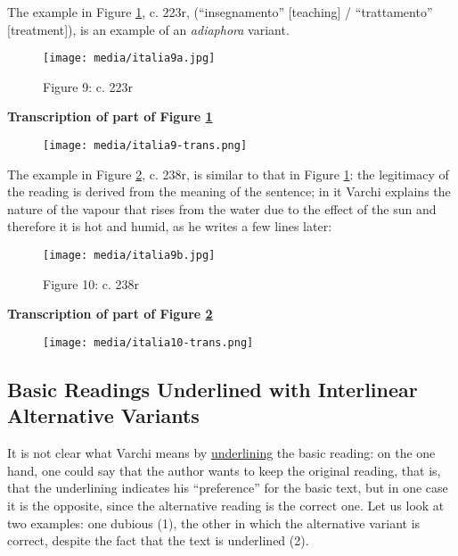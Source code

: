 \documentclass{article}
\begin{document}
The example in Figure \ref{fig:italia9a}, c. 223r, (``insegnamento'' [teaching] / ``trattamento'' [treatment]), is an example of an \emph{adiaphora} variant.

\begin{figure}[H]
    \centering
    \texttt{[image: media/italia9a.jpg]}
    \caption{Figure 9: c. 223r}
    \label{fig:italia9a}
\end{figure}

\textbf{Transcription of part of Figure \ref{fig:italia9a}}

\begin{figure}
    \centering
    \texttt{[image: media/italia9-trans.png]}
\end{figure}

The example in Figure \ref{fig:italia9b}, c. 238r, is similar to that in Figure \ref{fig:italia9a}:
the legitimacy of the reading is derived from the meaning of the
sentence; in it Varchi explains the nature of the vapour that rises from
the water due to the effect of the sun and therefore it is hot and
humid, as he writes a few lines later:

\begin{figure}[H]
    \centering
    \texttt{[image: media/italia9b.jpg]}
    \caption{Figure 10: c. 238r}
    \label{fig:italia9b}
\end{figure}

\textbf{Transcription of part of Figure \ref{fig:italia9b}}

\begin{figure}
    \centering
    \texttt{[image: media/italia10-trans.png]}
\end{figure}

\subsection{Basic Readings Underlined with Interlinear Alternative Variants}

It is not clear what Varchi means by \uline{underlining} the basic
reading: on the one hand, one could say that the author wants to keep
the original reading, that is, that the underlining indicates his
``preference'' for the basic text, but in one case it is the opposite,
since the alternative reading is the correct one. Let us look at two
examples: one dubious (1), the other in which the alternative variant is
correct, despite the fact that the text is underlined (2).
\end{document}
